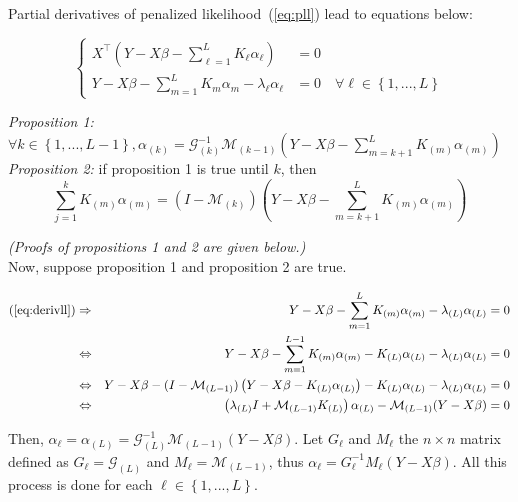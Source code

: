 \begin{changebar}[0.2cm]
\noindent Partial derivatives of penalized likelihood~(\ref{eq:pll}) lead to equations below:


\begin{equation} \label{eq:derivll}
\left\lbrace \begin{aligned}
X^\top (Y - X\beta - \sum\limits_{\ell = 1}^L K_{\ell} \alpha_{\ell}) & =  0 \\
Y - X\beta - \sum\limits_{m = 1}^L K_{m} \alpha_{m} - \lambda_{\ell} \alpha_{\ell} & =  0 \quad \forall \ell \in \left\lbrace 1,...,L \right\rbrace
\end{aligned} \right.
\end{equation}


\noindent \textit{Proposition 1:} $\forall k \in \left\lbrace 1, ..., L-1\right\rbrace, \alpha_{(k)} = \mathcal{G}_{(k)}^{-1} \mathcal{M}_{(k - 1)} \left( Y - X\beta - \sum\limits_{m = k + 1}^L K_{(m)} \alpha_{(m)} \right)$ \\

\noindent \textit{Proposition 2:} if proposition 1 is true until $k$, then 
$$\sum\limits_{j = 1}^k K_{(m)}\alpha_{(m)} = (I - \mathcal{M}_{(k)})\left( Y - X\beta - \sum\limits_{m = k + 1}^L K_{(m)}\alpha_{(m)} \right)$$

\noindent \textit{(Proofs of propositions 1 and 2 are given below.)} \\

\noindent Now, suppose proposition 1 and proposition 2 are true.

\begin{align*}
(\ref{eq:derivll}) \Rightarrow && Y - X\beta - \sum\limits_{m = 1}^L K_{(m)}\alpha_{(m)} - \lambda_{(L)}\alpha_{(L)} &= 0  \\
\Leftrightarrow &&  Y - X\beta - \sum\limits_{m = 1}^{L-1} K_{(m)}\alpha_{(m)} - K_{(L)}\alpha_{(L)} - \lambda_{(L)}\alpha_{(L)} &= 0 \\
\Leftrightarrow &&  Y - X\beta - (I - \mathcal{M}_{(L-1)})\left( Y - X\beta - K_{(L)}\alpha_{(L)} \right) - K_{(L)}\alpha_{(L)} - \lambda_{(L)}\alpha_{(L)}& = 0 \\ 
\Leftrightarrow && \left( \lambda_{(L)}I + \mathcal{M}_{(L-1)} K_{(L)} \right) \alpha_{(L)} - \mathcal{M}_{(L-1)} (Y - X\beta) &= 0    \\ 
\end{align*}


\noindent Then, $\alpha_{\ell} = \alpha_{(L)} = \mathcal{G}_{(L)}^{-1} \mathcal{M}_{(L - 1)} \left( Y - X\beta \right)$. Let $G_{\ell}$ and $M_{\ell}$ the $n \times n$ matrix defined as $G_{\ell} = \mathcal{G}_{(L)}$ and  $M_{\ell} = \mathcal{M}_{(L - 1)}$, thus $\alpha_{\ell} = G_{\ell}^{-1} M_{\ell} \left( Y - X\beta \right)$. All this process is done for each $\ell \in \left\lbrace 1, ..., L\right\rbrace$.  \\



\end{changebar}

